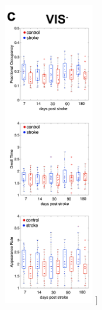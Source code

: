 \documentclass[phd,tocprelim]{cornell}
\renewcommand{\caption}[1]{\singlespacing\hangcaption{#1}\normalspacing}
\begin{document}
\begin{figure}[h!]
		\ContinuedFloat
		\captionsetup{labelformat=adja-page}
    \centering
    \includegraphics[width=0.35\textwidth]{chapter2/SupplementaryFig11c.png}
    \caption[]{}
\end{figure}
\null
\vfill
\clearpage
\null
\vfill
\end{document}
